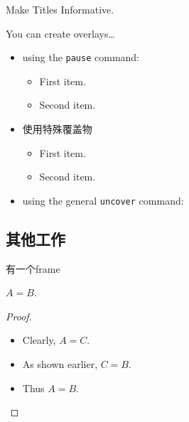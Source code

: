 \documentclass{beamer}
\begin{document}
\begin{frame}{Make Titles Informative.}

  You can create overlays\dots
  \begin{itemize}
  \item using the \texttt{pause} command:
    \begin{itemize}
    \item
      First item.
      \pause
    \item    
      Second item.
    \end{itemize}
  \item
    使用特殊覆盖物
    \begin{itemize}
    \item<3-> %
      First item.
    \item<4->
      Second item.
    \end{itemize}
  \item
    using the general \texttt{uncover} command:
    \begin{itemize}
    \end{itemize}
  \end{itemize}
\end{frame}


\subsection{其他工作}

\begin{frame}{有一个frame}
\end{frame}


\begin{frame}[<+->]
  \begin{theorem}
    $A = B$.
  \end{theorem}
  \begin{proof}
    \begin{itemize}
    \item Clearly, $A = C$.\pause
    \item As shown earlier,  $C = B$.\pause
    \item Thus $A = B$.\pause
    \end{itemize}
  \end{proof}
\end{frame}
\end{document}
